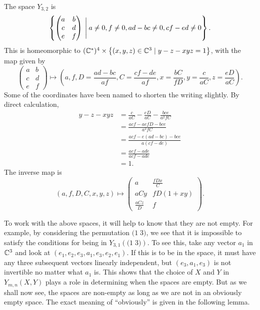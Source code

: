 \begin{example}
  The space $Y_{3,2}$ is
  \[\left\{ 
    \begin{pmatrix}
      a &b \\
      c & d \\
      e & f
    \end{pmatrix} \:\Bigg\vert\: a \neq 0, f \neq 0, ad-bc \neq
    0, cf-ed \neq 0 \right\}.
  \]
  This is homeomorphic to $(\mathbb{C}^*)^4\times \left\{ (x,y,z)\in\mathbb{C}^3 \mid
    y-z-xyz = 1 \right\}$, with the map given by
  \[
  \begin{pmatrix}
    a &b \\
    c & d \\
    e & f
  \end{pmatrix} \mapsto
  \left(a, f, D=\frac{ad-bc}{af}, C=\frac{cf-de}{af}, x=\frac{bC}{fD},
    y=\frac{c}{aC}, z=\frac{eD}{aC} \right). \]
  Some of the coordinates have been named to shorten the writing
  slightly. By direct calculation,
  \begin{align*}
    y-z-xyz &= \frac{c}{aC}-\frac{eD}{aC}-\frac{bce}{a^2fC} \\
            &= \frac{acf-aefD-bce}{a^2fC} \\
            &= \frac{acf-e(ad-bc)-bce}{a(cf-de)}  \\
            &= \frac{acf-ade}{acf-ade} \\
            &= 1.
  \end{align*}
  The inverse map is
  \[ (a,f,D,C,x,y,z) \mapsto
  \begin{pmatrix}
    a & \frac{fDx}{C} \\
    aCy & fD(1+xy) \\
    \frac{aCz}{D} & f
  \end{pmatrix}. \]
\end{example}



To work with the above spaces, it will help to know that they are not
empty. For example, by considering the permutation $\big(1\; 3\big)$,
we see that it is impossible to satisfy the 
conditions for being in $Y_{3,1}\left(\big(1\; 3\big)\right)$. To see
this, take any vector $a_1$ in $\mathbb{C}^3$ and look at
$(e_1,e_2,e_3,a_1,e_3,e_2,e_1)$. If this is to be in the space, it
must have any three subsequent vectors linearly independent, but
$(e_3,a_1,e_3)$ is not invertible no matter what $a_1$ is. This shows
that the choice of $X$ and $Y$ in $Y_{m,n}(X,Y)$ plays a role in
determining when the spaces are empty. But as we shall now see, the
spaces are non-empty as long as we are not in an obviously empty
space. The exact meaning of ``obviously'' is given in the following
lemma.

